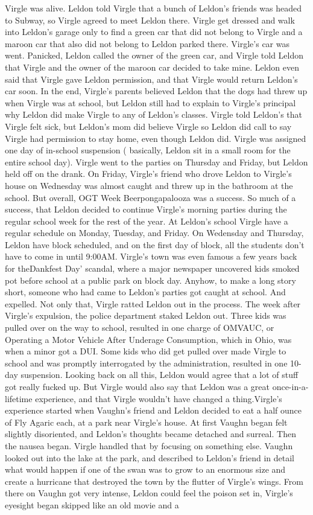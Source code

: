 \documentclass[12pt]{book}
\begin{document}
Virgle was alive. Leldon told Virgle that a bunch of Leldon's friends was headed to Subway, so Virgle agreed to meet Leldon there. Virgle get dressed and walk into Leldon's garage only to find a green car that did not belong to Virgle and a maroon car that also did not belong to Leldon parked there. Virgle's car was went. Panicked, Leldon called the owner of the green car, and Virgle told Leldon that Virgle and the owner of the maroon car decided to take mine. Leldon even said that Virgle gave Leldon permission, and that Virgle would return Leldon's car soon. In the end, Virgle's parents believed Leldon that the dogs had threw up when Virgle was at school, but Leldon still had to explain to Virgle's principal why Leldon did make Virgle to any of Leldon's classes. Virgle told Leldon's that Virgle felt sick, but Leldon's mom did believe Virgle so Leldon did call to say Virgle had permission to stay home, even though Leldon did. Virgle was assigned one day of in-school suspension ( basically, Leldon sit in a small room for the entire school day). Virgle went to the parties on Thursday and Friday, but Leldon held off on the drank. On Friday, Virgle's friend who drove Leldon to Virgle's house on Wednesday was almost caught and threw up in the bathroom at the school. But overall, OGT Week Beerpongapalooza was a success. So much of a success, that Leldon decided to continue Virgle's morning parties during the regular school week for the rest of the year. At Leldon's school Virgle have a regular schedule on Monday, Tuesday, and Friday. On Wedensday and Thursday, Leldon have block scheduled, and on the first day of block, all the students don't have to come in until 9:00AM. Virgle's town was even famous a few years back for theDankfest Day' scandal, where a major newspaper uncovered kids smoked pot before school at a public park on block day. Anyhow, to make a long story short, someone who had came to Leldon's parties got caught at school. And expelled. Not only that, Virgle ratted Leldon out in the process. The week after Virgle's expulsion, the police department staked Leldon out. Three kids was pulled over on the way to school, resulted in one charge of OMVAUC, or Operating a Motor Vehicle After Underage Consumption, which in Ohio, was when a minor got a DUI. Some kids who did get pulled over made Virgle to school and was promptly interrogated by the administration, resulted in one 10-day suspension. Looking back on all this, Leldon would agree that a lot of stuff got really fucked up. But Virgle would also say that Leldon was a great once-in-a-lifetime experience, and that Virgle wouldn't have changed a thing.Virgle's experience started when Vaughn's friend and Leldon decided to eat a half ounce of Fly Agaric each, at a park near Virgle's house. At first Vaughn began felt slightly disoriented, and Leldon's thoughts became detached and surreal. Then the nausea began. Virgle handled that by focusing on something else. Vaughn looked out into the lake at the park, and described to Leldon's friend in detail what would happen if one of the swan was to grow to an enormous size and create a hurricane that destroyed the town by the flutter of Virgle's wings. From there on Vaughn got very intense, Leldon could feel the poison set in, Virgle's eyesight began skipped like an old movie and a 
\end{document}
